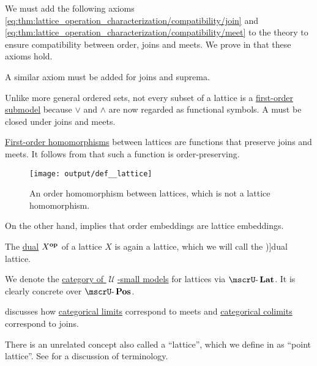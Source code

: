 \begin{definition}
\begin{thmenum}[resume=def:lattice]
    We must add the following axioms \eqref{eq:thm:lattice_operation_characterization/compatibility/join} and \eqref{eq:thm:lattice_operation_characterization/compatibility/meet} to the theory to ensure compatibility between order, joins and meets. We prove in  that these axioms hold.

    A similar axiom must be added for joins and suprema.

     Unlike more general ordered sets, not every subset of a lattice is a \hyperref[def:first_order_submodel]{first-order submodel} because \( \vee \) and \( \wedge \) are now regarded as functional symbols. A  must be closed under joins and meets.

     \hyperref[def:first_order_homomorphism]{First-order homomorphisms} between lattices are functions that preserve joins and meets. It follows from  that such a function is order-preserving.

    \begin{figure}[!ht]
      \centering
      \texttt{[image: output/def\_\_lattice]}
      \caption{An order homomorphism between lattices, which is not a lattice homomorphism.}
      \label{fig:def:lattice/homomorphism/order_homomorphism_not_lattice_homomorrphism}
    \end{figure}

    On the other hand,  implies that order embeddings are lattice embeddings.

     The \hyperref[def:preordered_set/opposite]{dual} \( X^\oppos \) of a lattice \( X \) is again a lattice, which we will call the \term[ru=двойственная (решётка) (\cite[exerc. 1.3]{КравченкоШвидефски2019ОбщаяАлгебра})]{dual lattice}.

     We denote the \hyperref[def:category_of_small_first_order_models]{category of \( \mscrU \)-small models} for lattices via \( \ucat{Lat} \). It is clearly concrete over \hyperref[def:partially_ordered_set]{\( \ucat{Pos} \)}.

     discusses how \hyperref[def:category_of_cones/limit]{categorical limits} correspond to meets and \hyperref[def:category_of_cones/colimit]{categorical colimits} correspond to joins.
  \end{thmenum}
\end{definition}
\begin{comments}
  \item There is an unrelated concept also called a \enquote{lattice}, which we define in  as \enquote{point lattice}. See  for a discussion of terminology.
\end{comments}

